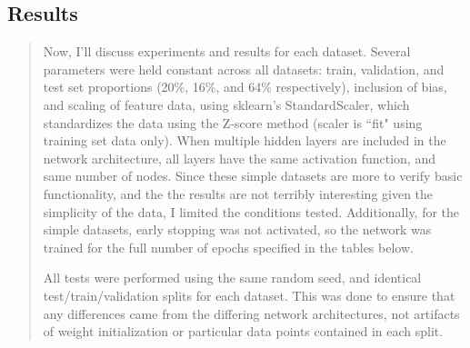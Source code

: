 \documentclass{article}
\begin{document}
\subsection*{Results}
\begin{quote}
	\setlength{\parindent}{10ex}
	\quad\quad\quad\quad Now, I'll discuss experiments and results for each dataset. Several parameters were held constant across all datasets: train, validation, and test set proportions (20\%, 16\%, and 64\% respectively), inclusion of bias, and scaling of feature data, using sklearn's StandardScaler, which standardizes the data using the Z-score method (scaler is ``fit" using training set data only). When multiple hidden layers are included in the network architecture, all layers have the same activation function, and same number of nodes. Since these simple datasets are more to verify basic functionality, and the the results are not terribly interesting given the simplicity of the data, I limited the conditions tested. Additionally, for the simple datasets, early stopping was not activated, so the network was trained for the full number of epochs specified in the tables below.
	
	All tests were performed using the same random seed, and identical test/train/validation splits for each dataset. This was done to ensure that any differences came from the differing network architectures, not artifacts of weight initialization or particular data points contained in each split.
\end{quote}

\clearpage
\end{document}
